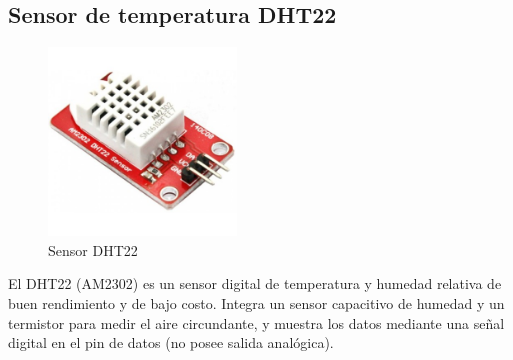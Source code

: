 
\subsection{Sensor de temperatura DHT22}

  \begin{figure}[H]
      \centering
      \includegraphics[width=5cm, height=5cm]{imagenes/dht22.jpg}
      \caption{Sensor DHT22}
      \label{imag:dht22}
   \end{figure}
   
El DHT22 (AM2302) es un sensor digital de temperatura y humedad relativa de buen rendimiento y de bajo costo. Integra un sensor capacitivo de humedad y un termistor para medir el aire circundante, y muestra los datos mediante una señal digital en el pin de datos (no posee salida analógica).\\

